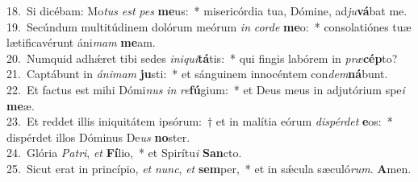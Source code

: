 {18.~}Si dicébam: Mo\textit{tus} \textit{est} \textit{pes} \textbf{me}us:~* misericórdia tua, Dómine, ad\textit{ju}\textbf{vá}bat me.\\
{19.~}Secúndum multitúdinem dolórum meórum \textit{in} \textit{cor}\textit{de} \textbf{me}o:~* consolatiónes tuæ lætificavérunt áni\textit{mam} \textbf{me}am.\\
{20.~}Numquid adhǽret tibi sedes \textit{i}\textit{ni}\textit{qui}\textbf{tá}tis:~* qui fingis labórem in \textit{præ}\textbf{cép}to?\\
{21.~}Captábunt in \textit{á}\textit{ni}\textit{mam} \textbf{ju}sti:~* et sánguinem innocéntem con\textit{dem}\textbf{ná}bunt.\\
{22.~}Et factus est mihi Dómi\textit{nus} \textit{in} \textit{re}\textbf{fú}gium:~* et Deus meus in adjutórium spe\textit{i} \textbf{me}æ.\\
{23.~}Et reddet illis iniquitátem ipsórum:~† et in malítia eórum \textit{di}\textit{spér}\textit{det} \textbf{e}os:~* dispérdet illos Dóminus De\textit{us} \textbf{no}ster.\\
{24.~}Glória \textit{Pa}\textit{tri}, \textit{et} \textbf{Fí}lio,~* et Spirítu\textit{i} \textbf{San}cto.\\
{25.~}Sicut erat in princípio, \textit{et} \textit{nunc}, \textit{et} \textbf{sem}per,~* et in sǽcula sæculó\textit{rum}. \textbf{A}men.\\
